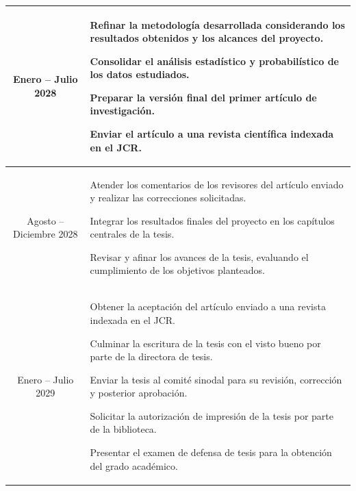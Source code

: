 \begin{longtable}{|c|p{}|}
	\centering Enero -- Julio 2028      & 
	\begin{list}{\textbullet}{%
			\setlength{\leftmargin}{0.2cm}%
			\addtolength{\topsep}{-1.1cm}%
			\addtolength{\labelsep}{-2mm}%
			\addtolength{\itemsep}{-2mm}%
			\setlength{\itemindent}{0cm}}
		\item Refinar la metodología desarrollada considerando los resultados obtenidos y los alcances del proyecto.
		\item Consolidar el análisis estadístico y probabilístico de los datos estudiados.
		\item Preparar la versión final del primer artículo de investigación.
		\item Enviar el artículo a una revista científica indexada en el JCR.
	\end{list} \\ \hline
	
	\centering Agosto -- Diciembre 2028 & 
	\begin{list}{\textbullet}{%
			\setlength{\leftmargin}{0.2cm}%
			\addtolength{\topsep}{-1.1cm}%
			\addtolength{\labelsep}{-2mm}%
			\addtolength{\itemsep}{-2mm}%
			\setlength{\itemindent}{0cm}}
		\item Atender los comentarios de los revisores del artículo enviado y realizar las correcciones solicitadas.
		\item Integrar los resultados finales del proyecto en los capítulos centrales de la tesis.
		\item Revisar y afinar los avances de la tesis, evaluando el cumplimiento de los objetivos planteados.
	\end{list} \\ \hline
	
	\centering Enero -- Julio 2029      & 
	\begin{list}{\textbullet}{%
			\setlength{\leftmargin}{0.2cm}%
			\addtolength{\topsep}{-1.1cm}%
			\addtolength{\labelsep}{-2mm}%
			\addtolength{\itemsep}{-2mm}%
			\setlength{\itemindent}{0cm}}
		\item Obtener la aceptación del artículo enviado a una revista indexada en el JCR.
		\item Culminar la escritura de la tesis con el visto bueno por parte de la directora de tesis.
		\item Enviar la tesis al comité sinodal para su revisión, corrección y posterior aprobación.
		\item Solicitar la autorización de impresión de la tesis por parte de la biblioteca.
		\item Presentar el examen de defensa de tesis para la obtención del grado académico.
	\end{list} \\ \hline
\end{longtable}

